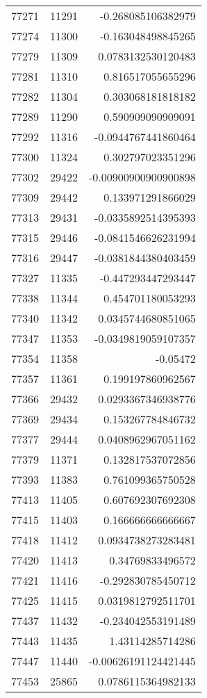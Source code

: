 \begin{tabular}{r | r | r}
77271 & 11291 & -0.268085106382979 \\
77274 & 11300 & -0.163048498845265 \\
77279 & 11309 & 0.0783132530120483 \\
77281 & 11310 & 0.816517055655296 \\
77282 & 11304 & 0.303068181818182 \\
77289 & 11290 & 0.590909090909091 \\
77292 & 11316 & -0.0944767441860464 \\
77300 & 11324 & 0.302797023351296 \\
77302 & 29422 & -0.00900900900900898 \\
77309 & 29442 & 0.133971291866029 \\
77313 & 29431 & -0.0335892514395393 \\
77315 & 29446 & -0.0841546626231994 \\
77316 & 29447 & -0.0381844380403459 \\
77327 & 11335 & -0.447293447293447 \\
77338 & 11344 & 0.454701180053293 \\
77340 & 11342 & 0.0345744680851065 \\
77347 & 11353 & -0.0349819059107357 \\
77354 & 11358 & -0.05472 \\
77357 & 11361 & 0.199197860962567 \\
77366 & 29432 & 0.0293367346938776 \\
77369 & 29434 & 0.153267784846732 \\
77377 & 29444 & 0.0408962967051162 \\
77379 & 11371 & 0.132817537072856 \\
77393 & 11383 & 0.761099365750528 \\
77413 & 11405 & 0.607692307692308 \\
77415 & 11403 & 0.166666666666667 \\
77418 & 11412 & 0.0934738273283481 \\
77420 & 11413 & 0.34769833496572 \\
77421 & 11416 & -0.292830785450712 \\
77425 & 11415 & 0.0319812792511701 \\
77437 & 11432 & -0.234042553191489 \\
77443 & 11435 & 1.43114285714286 \\
77447 & 11440 & -0.00626191124421445 \\
77453 & 25865 & 0.0786115364982133 \\

\end{tabular}
